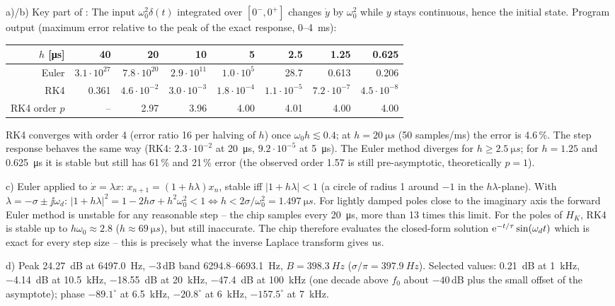 \begin{solution}
a)/b) Key part of :
The input $\omega_0^2\delta(t)$ integrated over $[0^-,0^+]$ changes $\dot y$ by
$\omega_0^2$ while $y$ stays continuous, hence the initial state.
Program output (maximum error relative to the peak of the exact response,
\SI{0}{}--\SI{4}{ms}):
\begin{center}\footnotesize\setlength{\tabcolsep}{4pt}
\begin{tabular}{rrrrrrrr}
\toprule
$h$ [\si{\micro s}] & 40 & 20 & 10 & 5 & 2.5 & 1.25 & 0.625\\
\midrule
Euler & $3.1\cdot10^{27}$ & $7.8\cdot10^{20}$ & $2.9\cdot10^{11}$ & $1.0\cdot10^{5}$ & 28.7 & 0.613 & 0.206\\
RK4 & 0.361 & $4.6\cdot10^{-2}$ & $3.0\cdot10^{-3}$ & $1.8\cdot10^{-4}$ & $1.1\cdot10^{-5}$ & $7.2\cdot10^{-7}$ & $4.5\cdot10^{-8}$\\
RK4 order $p$ & -- & 2.97 & 3.96 & 4.00 & 4.01 & 4.00 & 4.00\\
\bottomrule
\end{tabular}
\end{center}
RK4 converges with order 4 (error ratio 16 per halving of $h$) once
$\omega_0h\lesssim0.4$; at $h=\SI{20}{\micro s}$ (50 samples/ms) the error is
4.6\,\%. The step response behaves the same way (RK4: $2.3\cdot10^{-2}$ at
\SI{20}{\micro s}, $9.2\cdot10^{-5}$ at \SI{5}{\micro s}). The Euler method
diverges for $h\ge\SI{2.5}{\micro s}$; for $h=1.25$ and \SI{0.625}{\micro s} it
is stable but still has 61\,\% and 21\,\% error (the observed order 1.57 is
still pre-asymptotic, theoretically $p=1$).

c) Euler applied to $\dot x=\lambda x$: $x_{n+1}=(1+h\lambda)x_n$, stable iff
$|1+h\lambda|<1$ (a circle of radius 1 around $-1$ in the $h\lambda$-plane).
With $\lambda=-\sigma\pm\jj\omega_d$:
$|1+h\lambda|^2=1-2h\sigma+h^2\omega_0^2<1\iff h<2\sigma/\omega_0^2=\SI{1.497}{\micro s}$.
For lightly damped poles close to the imaginary axis the forward Euler method
is unstable for any reasonable step -- the chip samples every
\SI{20}{\micro s}, more than 13 times this limit. For the poles of $H_K$,
RK4 is stable up to $h\omega_0\approx2.8$ ($h\approx\SI{69}{\micro s}$),
but still inaccurate. The chip therefore evaluates the closed-form solution
$\mathrm{e}^{-t/\tau}\sin(\omega_dt)$ which is exact for every step size -- this is
precisely what the inverse Laplace transform gives us.

d) Peak \SI{24.27}{dB} at \SI{6497.0}{Hz}, $-3$\,dB band
\SI{6294.8}{}--\SI{6693.1}{Hz}, $B=\SI{398.3}{Hz}$ ($\sigma/\pi=\SI{397.9}{Hz}$).
Selected values: \SI{0.21}{dB} at \SI{1}{kHz}, \SI{-4.14}{dB} at \SI{10.5}{kHz},
\SI{-18.55}{dB} at \SI{20}{kHz}, \SI{-47.4}{dB} at \SI{100}{kHz} (one decade
above $f_0$ about $-40$\,dB plus the small offset of the asymptote); phase
$-89.1^\circ$ at \SI{6.5}{kHz}, $-20.8^\circ$ at \SI{6}{kHz}, $-157.5^\circ$ at
\SI{7}{kHz}.
\end{solution}

